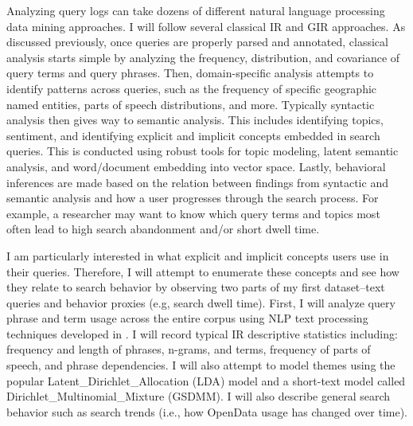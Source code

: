 Analyzing query logs can take dozens of different natural language processing data mining approaches. I will follow several classical IR and GIR approaches. As discussed previously, once queries are properly parsed and annotated, classical analysis starts simple by analyzing the frequency, distribution, and covariance of query terms and query phrases. Then, domain-specific analysis attempts to identify patterns across queries, such as the frequency of specific geographic named entities, parts of speech distributions, and more. Typically syntactic analysis then gives way to semantic analysis. This includes identifying topics, sentiment, and identifying explicit and implicit concepts embedded in search queries. This is conducted using robust tools for topic modeling, latent semantic analysis, and word/document embedding into vector space. Lastly, behavioral inferences are made based on the relation between findings from syntactic and semantic analysis and how a user progresses through the search process. For example, a researcher may want to know which query terms and topics most often lead to high search abandonment and/or short dwell time.

I am particularly interested in what explicit and implicit concepts users use in their queries. Therefore, I will attempt to enumerate these concepts and see how they relate to search behavior by observing two parts of my first dataset–text queries and behavior proxies (e.g, search dwell time). First, I will analyze query phrase and term usage across the entire corpus using NLP text processing techniques developed in \cite{Sanderson2007} \cite{Dittrich2015} \cite{Derungs2016} \cite{Gablasova2017} \cite{Hamzei2019b}. I will record typical IR descriptive statistics including: frequency and length of phrases, n-grams, and terms, frequency of parts of speech, and phrase dependencies. I will also attempt to model themes using the popular \gls{Latent_Dirichlet_Allocation} (\acrshort{LDA}) model and a short-text model called \gls{Dirichlet_Multinomial_Mixture} (\acrshort{GSDMM}). I will also describe general search behavior such as search trends (i.e., how OpenData usage has changed over time).

